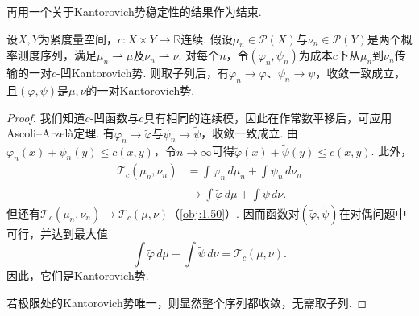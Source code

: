 再用一个关于Kantorovich势稳定性的结果作为结束.

\begin{theorem}\label{obj:1.52}
设$X,Y$为紧度量空间，$c:X\times Y\to\mathbb R$连续. 假设$\mu_n\in\mathscr P(X)$与$\nu_n\in\mathscr P(Y)$是两个概率测度序列，满足$\mu_n\rightharpoonup\mu$及$\nu_n\rightharpoonup\nu$. 对每个$n$，令$(\varphi_n,\psi_n)$为成本$c$下从$\mu_n$到$\nu_n$传输的一对$c$-凹Kantorovich势. 则取子列后，有$\varphi_n\to\varphi$、$\psi_n\to\psi$，收敛一致成立，且$(\varphi,\psi)$是$\mu,\nu$的一对Kantorovich势.
\end{theorem}
\begin{proof}
我们知道$c$-凹函数与$c$具有相同的连续模，因此在作常数平移后，可应用Ascoli--Arzel\`a定理. 有$\varphi_n\to\widetilde\varphi$与$\psi_n\to\widetilde\psi$，收敛一致成立. 由$\varphi_n(x)+\psi_n(y)\le c(x,y)$，令$n\to\infty$可得$\widetilde\varphi(x)+\widetilde\psi(y)\le c(x,y)$. 此外，
\begin{equation*}
\begin{aligned}
\mathscr T_c(\mu_n,\nu_n)
&=\int\varphi_n\,d\mu_n+\int\psi_n\,d\nu_n\\
&\longrightarrow\int\widetilde\varphi\,d\mu+\int\widetilde\psi\,d\nu.
\end{aligned}
\end{equation*}
但还有$\mathscr T_c(\mu_n,\nu_n)\to\mathscr T_c(\mu,\nu)$（\autoref{obj:1.50}）. 因而函数对$(\widetilde\varphi,\widetilde\psi)$在对偶问题中可行，并达到最大值
\[
\int\widetilde\varphi\,d\mu+\int\widetilde\psi\,d\nu=\mathscr T_c(\mu,\nu).
\]
因此，它们是Kantorovich势.

若极限处的Kantorovich势唯一，则显然整个序列都收敛，无需取子列.
\end{proof}
